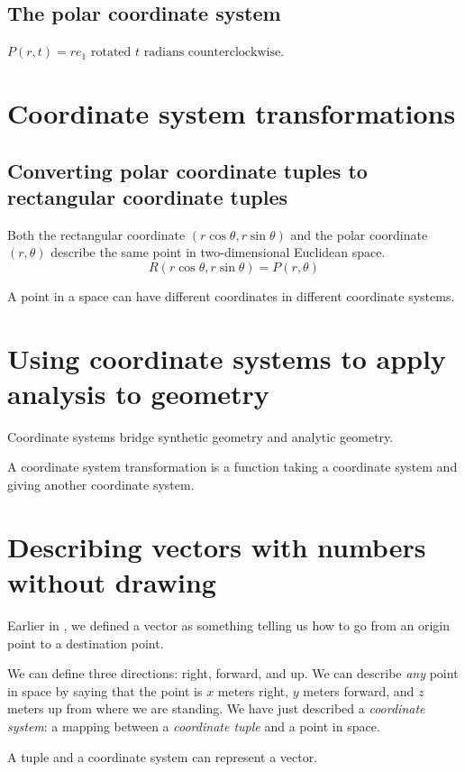 \subsection{The polar coordinate system}

\(P(r,t) = r e_1 \text{ rotated } t \text{ radians counterclockwise}\).

\section{Coordinate system transformations}

\subsection{Converting polar coordinate tuples to rectangular coordinate tuples}

Both the rectangular coordinate $(r\cos\theta, r\sin\theta)$ and the polar coordinate $(r,\theta)$
describe the same point in two-dimensional Euclidean space.
\[
R(r\cos\theta, r\sin\theta) = P(r,\theta)
\]

A point in a space can have different coordinates in different coordinate systems.

\section{Using coordinate systems to apply analysis to geometry}

Coordinate systems bridge synthetic geometry and analytic geometry.

A coordinate system transformation is a function taking a coordinate system and giving another coordinate system.

\section{Describing vectors with numbers without drawing}

Earlier in ,
we defined a vector as something telling us
how to go from an origin point to a destination point.

We can define three directions: right, forward, and up.
We can describe \emph{any} point in space by saying that the point is
\(x\) meters right, \(y\) meters forward, and \(z\) meters up from where we are standing.
We have just described a \emph{coordinate system}:
a mapping between a \emph{coordinate tuple} and a point in space.

A tuple and a coordinate system can represent a vector.


